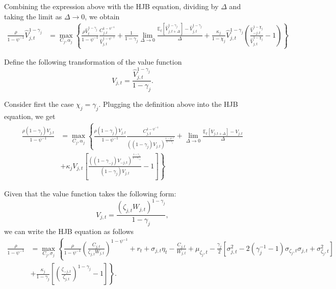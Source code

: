 \documentclass[11pt,english]{article}
\begin{document}
Combining the expression above with the HJB equation, dividing by $\Delta$ and taking the limit as $\Delta \rightarrow 0$, we obtain
\begin{align*}
    \frac{\rho}{1-\psi^{-1}} \hat{V}_{j,t}^{1-\gamma_j} &= \max_{C_j,\alpha_j}\left\{ \frac{\rho \hat{V}_t^{1-\gamma_j} }{1-\psi^{-1}}
     \frac{C_{j,t}^{1-\psi^{-1}}}{\hat{V}_{j,t}^{1-\psi^{-1}}} + \frac{1}{1-\gamma_j} \lim_{\Delta \rightarrow 0} \frac{\mathbb{E}_t[\hat{V}_{j,t+\Delta}^{1-\gamma_j}] -\hat{V}_{j,t}^{1-\gamma_j} }{\Delta} + \frac{\kappa_j}{1-\chi_j}  \hat{V}_{j,t}^{1-\gamma_j}\left( \frac{\hat{V}_{-j,t}^{1-\chi_j}}{\hat{V}_{j,t}^{1-\chi_j}} -1 \right)\right\}
\end{align*}

Define the following transformation of the value function
\begin{equation*}
    V_{j,t} = \frac{\hat{V}_{j,t}^{1-\gamma_j}}{1-\gamma_j}.
\end{equation*} 

Consider first the case $\chi_j = \gamma_j$. Plugging the definition above into the HJB equation, we get
\begin{align*}
    \frac{\rho (1-\gamma_j) V_{j,t}}{1-\psi^{-1}} &= \max_{C_j,\alpha_j}\left\{ \frac{\rho (1-\gamma_j) V_{j,t} }{1-\psi^{-1}}
     \frac{C_{j,t}^{1-\psi^{-1}}}{((1-\gamma_j)V_{j,t})^{\frac{1-\psi^{-1}}{1-\gamma_j}}} +  \lim_{\Delta \rightarrow 0} \frac{\mathbb{E}_t[V_{j,t+\Delta}] -V_{j,t} }{\Delta}  \right.\\
     &+\left.\kappa_j V_{j,t} \left[ \frac{\left((1-\gamma_{-j})V_{-j,t}\right)^{\frac{1-\gamma_j}{1-\gamma_{-j}}}}{(1-\gamma_j)V_{j,t}} -1 \right]\right\}
\end{align*}

Given that the value function takes the following form:
\begin{equation*}
    V_{j,t} = \frac{(\zeta_{j,t} W_{j,t})^{1-\gamma_j}}{1-\gamma_j},
\end{equation*}
we can write the HJB equation as follows
\begin{align*}
    \frac{\rho}{1-\psi^{-1}} &= \max_{C_j,\sigma_j}\left\{ \frac{\rho }{1-\psi^{-1}}
     \left(\frac{C_{j,t}}{\zeta_{j,t} W_{j,t}} \right)^{1-\psi^{-1}}  +r_t + \sigma_{j,t} \eta_t - \frac{C_{j,t}}{W_{j,t}} + \mu_{\zeta_j,t} - \frac{\gamma_j}{2} \left[\sigma_{j,t}^2 -2 (\gamma_j^{-1}-1) \sigma_{\zeta_j,t} \sigma_{j,t}+ \sigma_{\zeta_j,t}^2\right]   \right.\\
     &+\left.\frac{\kappa_j}{1-\gamma_j} \left[\left( \frac{\zeta_{-j,t}}{\zeta_{j,t}}\right)^{1-\gamma_j} -1 \right]\right\}.
\end{align*}
\end{document}
